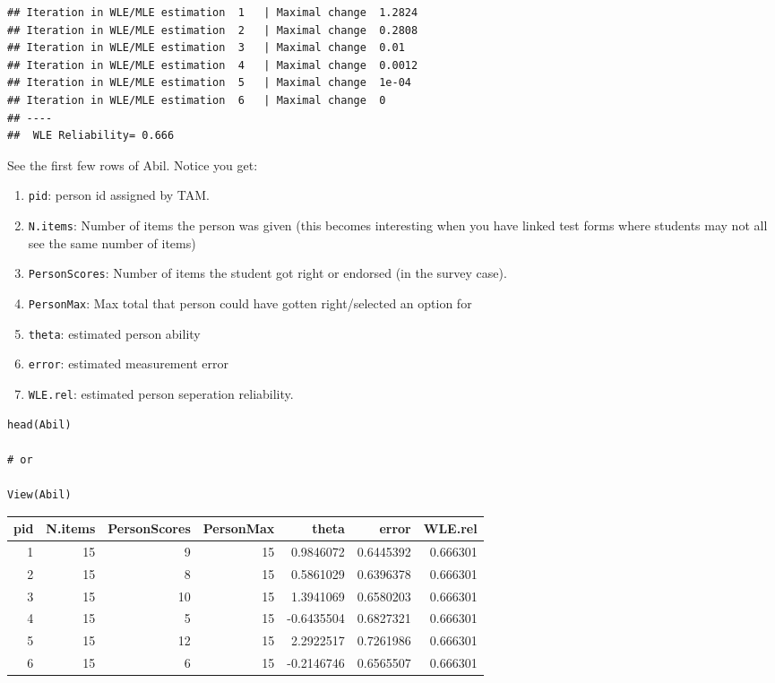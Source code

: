 \documentclass[
]{book}
\providecommand{\tightlist}{%
  \setlength{\itemsep}{0pt}\setlength{\parskip}{0pt}}
\begin{document}
\begin{verbatim}
## Iteration in WLE/MLE estimation  1   | Maximal change  1.2824 
## Iteration in WLE/MLE estimation  2   | Maximal change  0.2808 
## Iteration in WLE/MLE estimation  3   | Maximal change  0.01 
## Iteration in WLE/MLE estimation  4   | Maximal change  0.0012 
## Iteration in WLE/MLE estimation  5   | Maximal change  1e-04 
## Iteration in WLE/MLE estimation  6   | Maximal change  0 
## ----
##  WLE Reliability= 0.666
\end{verbatim}

See the first few rows of Abil. Notice you get:

\begin{enumerate}
\def\labelenumi{\arabic{enumi}.}
\tightlist
\item
  \texttt{pid}: person id assigned by TAM.
\item
  \texttt{N.items}: Number of items the person was given (this becomes interesting when you have linked test forms where students may not all see the same number of items)
\item
  \texttt{PersonScores}: Number of items the student got right or endorsed (in the survey case).
\item
  \texttt{PersonMax}: Max total that person could have gotten right/selected an option for
\item
  \texttt{theta}: estimated person ability
\item
  \texttt{error}: estimated measurement error
\item
  \texttt{WLE.rel}: estimated person seperation reliability.
\end{enumerate}

\begin{verbatim}
head(Abil)

# or

View(Abil)
\end{verbatim}

\begin{tabular}{r|r|r|r|r|r|r}
\hline
pid & N.items & PersonScores & PersonMax & theta & error & WLE.rel\\
\hline
1 & 15 & 9 & 15 & 0.9846072 & 0.6445392 & 0.666301\\
\hline
2 & 15 & 8 & 15 & 0.5861029 & 0.6396378 & 0.666301\\
\hline
3 & 15 & 10 & 15 & 1.3941069 & 0.6580203 & 0.666301\\
\hline
4 & 15 & 5 & 15 & -0.6435504 & 0.6827321 & 0.666301\\
\hline
5 & 15 & 12 & 15 & 2.2922517 & 0.7261986 & 0.666301\\
\hline
6 & 15 & 6 & 15 & -0.2146746 & 0.6565507 & 0.666301\\
\hline
\end{tabular}
\end{document}
